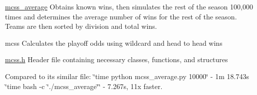 \begin{DoxyEnumerate}
\item \hyperlink{namespacemcss__average}{mcss\+\_\+average} Obtains known wins, then simulates the rest of the season 100,000 times and determines the average number of wins for the rest of the season. Teams are then sorted by division and total wins.
\item mcss Calculates the playoff odds using wildcard and head to head wins
\item \hyperlink{mcss_8h_source}{mcss.\+h} Header file containing necessary classes, functions, and structures
\end{DoxyEnumerate}

Compared to its similar file\+: \char`\"{}time python mcss\+\_\+average.\+py 10000\char`\"{} -\/ 1m 18.\+743s \char`\"{}time bash -\/c \char`\"{}./mcss\+\_\+average\char`\"{}\char`\"{} -\/ 7.\+267s, 11x faster. 